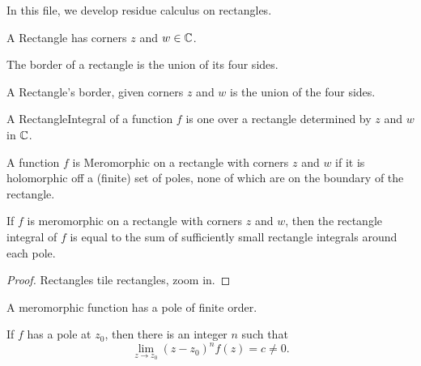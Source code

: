 

In this file, we develop residue calculus on rectangles.

\begin{definition}\label{Rectangle}\leanok
A Rectangle has corners $z$ and $w \in \C$.
\end{definition}



The border of a rectangle is the union of its four sides.
\begin{definition}\label{RectangleBorder}\leanok
A Rectangle's border, given corners $z$ and $w$ is the union of the four sides.
\end{definition}



\begin{definition}\label{RectangleIntegral}\leanok
A RectangleIntegral of a function $f$ is one over a rectangle determined by $z$ and $w$ in $\C$.
\end{definition}



\begin{definition}\label{MeromorphicOnRectangle}\leanok
{}
A function $f$ is Meromorphic on a rectangle with corners $z$ and $w$ if it is holomorphic off a
(finite) set of poles, none of which are on the boundary of the rectangle.
\end{definition}



\begin{theorem}\label{RectangleIntegralEqSumOfRectangles}
If $f$ is meromorphic on a rectangle with corners $z$ and $w$, then the rectangle integral of $f$
is equal to the sum of sufficiently small rectangle integrals around each pole.
\end{theorem}



\begin{proof}
Rectangles tile rectangles, zoom in.
\end{proof}



A meromorphic function has a pole of finite order.
\begin{definition}\label{PoleOrder}
If $f$ has a pole at $z_0$, then there is an integer $n$ such that
$$
\lim_{z\to z_0} (z-z_0)^n f(z) = c \neq 0.
$$
\end{definition}

